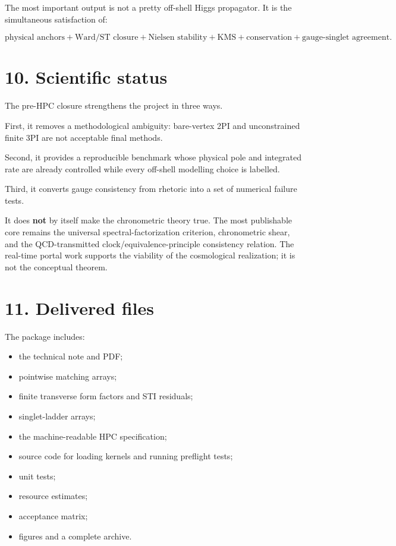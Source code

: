 \documentclass[
  10pt,
]{article}
\providecommand{\tightlist}{%
  \setlength{\itemsep}{0pt}\setlength{\parskip}{0pt}}
\begin{document}
The most important output is not a pretty off-shell Higgs propagator. It
is the simultaneous satisfaction of:

\[
\boxed{
\text{physical anchors}
+
\text{Ward/ST closure}
+
\text{Nielsen stability}
+
\text{KMS}
+
\text{conservation}
+
\text{gauge-singlet agreement}.
}
\]

\section{10. Scientific status}\label{scientific-status}

The pre-HPC closure strengthens the project in three ways.

First, it removes a methodological ambiguity: bare-vertex 2PI and
unconstrained finite 3PI are not acceptable final methods.

Second, it provides a reproducible benchmark whose physical pole and
integrated rate are already controlled while every off-shell modelling
choice is labelled.

Third, it converts gauge consistency from rhetoric into a set of
numerical failure tests.

It does \textbf{not} by itself make the chronometric theory true. The
most publishable core remains the universal spectral-factorization
criterion, chronometric shear, and the QCD-transmitted
clock/equivalence-principle consistency relation. The real-time portal
work supports the viability of the cosmological realization; it is not
the conceptual theorem.

\section{11. Delivered files}\label{delivered-files}

The package includes:

\begin{itemize}
\tightlist
\item
  the technical note and PDF;
\item
  pointwise matching arrays;
\item
  finite transverse form factors and STI residuals;
\item
  singlet-ladder arrays;
\item
  the machine-readable HPC specification;
\item
  source code for loading kernels and running preflight tests;
\item
  unit tests;
\item
  resource estimates;
\item
  acceptance matrix;
\item
  figures and a complete archive.
\end{itemize}
\end{document}
